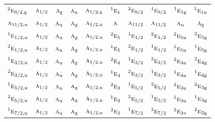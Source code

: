 \documentclass[10pt,a4paper]{article}
\numberwithin{equation}{section}
\newcommand{\irr}[1]{\text{\normalfont\scshape #1}}
\newcommand{\conjpair}[1]{{}^{#1}}
\newcommand{\ptag}[1]{\mathrm{#1}}
\begin{document}
{\begin{longtable}{@{}lccccccccc@{}}
$\conjpair{2}\irr{e}_{9/2,\ptag{g}}$ & $\irr{a}_{1/2}$ & $\irr{a}_{\ptag{g}}$ & $\irr{a}_{\ptag{u}}$ & $\irr{a}_{1/2,\ptag{g}}$ & $\conjpair{1}\irr{e}_{1}$ & $\conjpair{2}\irr{e}_{9/2}$ & $\conjpair{1}\irr{e}_{9/2}$ & $\conjpair{1}\irr{e}_{1\ptag{g}}$ & $\conjpair{1}\irr{e}_{1\ptag{u}}$\\
$\irr{a}_{11/2,\ptag{u}}$ & $\irr{a}_{1/2}$ & $\irr{a}_{\ptag{u}}$ & $\irr{a}_{\ptag{g}}$ & $\irr{a}_{1/2,\ptag{u}}$ & $\irr{a}$ & $\irr{a}_{11/2}$ & $\irr{a}_{11/2}$ & $\irr{a}_{\ptag{u}}$ & $\irr{a}_{\ptag{g}}$\\
$\conjpair{1}\irr{e}_{1/2,\ptag{u}}$ & $\irr{a}_{1/2}$ & $\irr{a}_{\ptag{u}}$ & $\irr{a}_{\ptag{g}}$ & $\irr{a}_{1/2,\ptag{u}}$ & $\conjpair{2}\irr{e}_{5}$ & $\conjpair{1}\irr{e}_{1/2}$ & $\conjpair{2}\irr{e}_{1/2}$ & $\conjpair{2}\irr{e}_{5\ptag{u}}$ & $\conjpair{2}\irr{e}_{5\ptag{g}}$\\
$\conjpair{2}\irr{e}_{1/2,\ptag{u}}$ & $\irr{a}_{1/2}$ & $\irr{a}_{\ptag{u}}$ & $\irr{a}_{\ptag{g}}$ & $\irr{a}_{1/2,\ptag{u}}$ & $\conjpair{1}\irr{e}_{5}$ & $\conjpair{2}\irr{e}_{1/2}$ & $\conjpair{1}\irr{e}_{1/2}$ & $\conjpair{1}\irr{e}_{5\ptag{u}}$ & $\conjpair{1}\irr{e}_{5\ptag{g}}$\\
$\conjpair{1}\irr{e}_{3/2,\ptag{u}}$ & $\irr{a}_{1/2}$ & $\irr{a}_{\ptag{u}}$ & $\irr{a}_{\ptag{g}}$ & $\irr{a}_{1/2,\ptag{u}}$ & $\conjpair{2}\irr{e}_{4}$ & $\conjpair{1}\irr{e}_{3/2}$ & $\conjpair{2}\irr{e}_{3/2}$ & $\conjpair{2}\irr{e}_{4\ptag{u}}$ & $\conjpair{2}\irr{e}_{4\ptag{g}}$\\
$\conjpair{2}\irr{e}_{3/2,\ptag{u}}$ & $\irr{a}_{1/2}$ & $\irr{a}_{\ptag{u}}$ & $\irr{a}_{\ptag{g}}$ & $\irr{a}_{1/2,\ptag{u}}$ & $\conjpair{1}\irr{e}_{4}$ & $\conjpair{2}\irr{e}_{3/2}$ & $\conjpair{1}\irr{e}_{3/2}$ & $\conjpair{1}\irr{e}_{4\ptag{u}}$ & $\conjpair{1}\irr{e}_{4\ptag{g}}$\\
$\conjpair{1}\irr{e}_{5/2,\ptag{u}}$ & $\irr{a}_{1/2}$ & $\irr{a}_{\ptag{u}}$ & $\irr{a}_{\ptag{g}}$ & $\irr{a}_{1/2,\ptag{u}}$ & $\conjpair{2}\irr{e}_{3}$ & $\conjpair{1}\irr{e}_{5/2}$ & $\conjpair{2}\irr{e}_{5/2}$ & $\conjpair{2}\irr{e}_{3\ptag{u}}$ & $\conjpair{2}\irr{e}_{3\ptag{g}}$\\
$\conjpair{2}\irr{e}_{5/2,\ptag{u}}$ & $\irr{a}_{1/2}$ & $\irr{a}_{\ptag{u}}$ & $\irr{a}_{\ptag{g}}$ & $\irr{a}_{1/2,\ptag{u}}$ & $\conjpair{1}\irr{e}_{3}$ & $\conjpair{2}\irr{e}_{5/2}$ & $\conjpair{1}\irr{e}_{5/2}$ & $\conjpair{1}\irr{e}_{3\ptag{u}}$ & $\conjpair{1}\irr{e}_{3\ptag{g}}$\\
$\conjpair{1}\irr{e}_{7/2,\ptag{u}}$ & $\irr{a}_{1/2}$ & $\irr{a}_{\ptag{u}}$ & $\irr{a}_{\ptag{g}}$ & $\irr{a}_{1/2,\ptag{u}}$ & $\conjpair{2}\irr{e}_{2}$ & $\conjpair{1}\irr{e}_{7/2}$ & $\conjpair{2}\irr{e}_{7/2}$ & $\conjpair{2}\irr{e}_{2\ptag{u}}$ & $\conjpair{2}\irr{e}_{2\ptag{g}}$\\

\end{longtable}}
\end{document}
